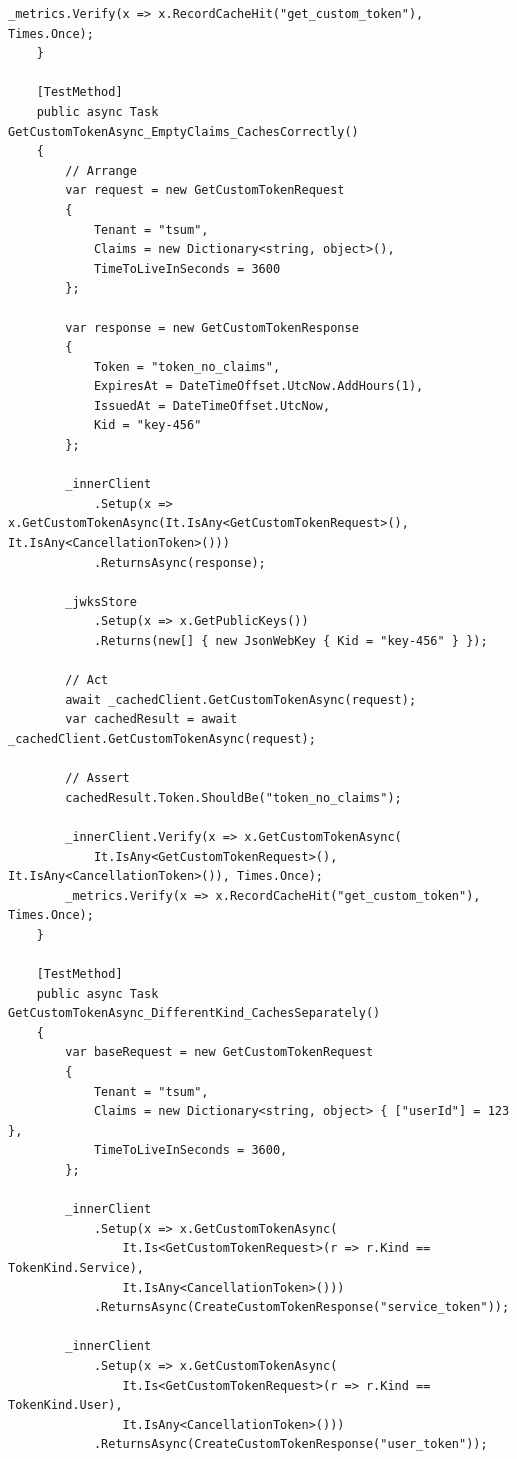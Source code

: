 \begin{lstlisting}[language={[Sharp]C},
  label={lst:app-cached-client-tests},
  caption={Класс CachedAuthJwtClientTests: набор юнит-тестов для кеширующего клиента}]
        _metrics.Verify(x => x.RecordCacheHit("get_custom_token"), Times.Once);
    }

    [TestMethod]
    public async Task GetCustomTokenAsync_EmptyClaims_CachesCorrectly()
    {
        // Arrange
        var request = new GetCustomTokenRequest
        {
            Tenant = "tsum",
            Claims = new Dictionary<string, object>(),
            TimeToLiveInSeconds = 3600
        };

        var response = new GetCustomTokenResponse
        {
            Token = "token_no_claims",
            ExpiresAt = DateTimeOffset.UtcNow.AddHours(1),
            IssuedAt = DateTimeOffset.UtcNow,
            Kid = "key-456"
        };

        _innerClient
            .Setup(x => x.GetCustomTokenAsync(It.IsAny<GetCustomTokenRequest>(), It.IsAny<CancellationToken>()))
            .ReturnsAsync(response);

        _jwksStore
            .Setup(x => x.GetPublicKeys())
            .Returns(new[] { new JsonWebKey { Kid = "key-456" } });

        // Act
        await _cachedClient.GetCustomTokenAsync(request);
        var cachedResult = await _cachedClient.GetCustomTokenAsync(request);

        // Assert
        cachedResult.Token.ShouldBe("token_no_claims");

        _innerClient.Verify(x => x.GetCustomTokenAsync(
            It.IsAny<GetCustomTokenRequest>(), It.IsAny<CancellationToken>()), Times.Once);
        _metrics.Verify(x => x.RecordCacheHit("get_custom_token"), Times.Once);
    }

    [TestMethod]
    public async Task GetCustomTokenAsync_DifferentKind_CachesSeparately()
    {
        var baseRequest = new GetCustomTokenRequest
        {
            Tenant = "tsum",
            Claims = new Dictionary<string, object> { ["userId"] = 123 },
            TimeToLiveInSeconds = 3600,
        };

        _innerClient
            .Setup(x => x.GetCustomTokenAsync(
                It.Is<GetCustomTokenRequest>(r => r.Kind == TokenKind.Service),
                It.IsAny<CancellationToken>()))
            .ReturnsAsync(CreateCustomTokenResponse("service_token"));

        _innerClient
            .Setup(x => x.GetCustomTokenAsync(
                It.Is<GetCustomTokenRequest>(r => r.Kind == TokenKind.User),
                It.IsAny<CancellationToken>()))
            .ReturnsAsync(CreateCustomTokenResponse("user_token"));


\end{lstlisting}
